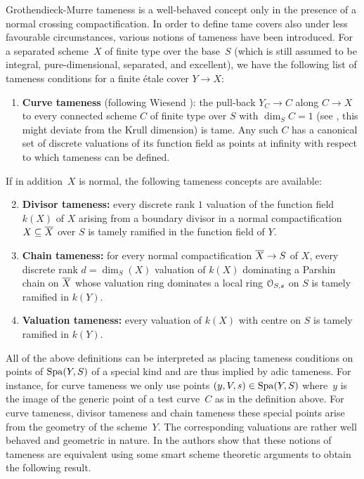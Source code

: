 Grothendieck-Murre tameness is a well-behaved concept only in the presence of a normal crossing compactification.
In order to define tame covers also under less favourable circumstances, various notions of tameness have been introduced.
For a separated scheme~$X$ of finite type over the base~$S$ (which is still assumed to be integral, pure-dimensional, separated, and excellent), we have the following list of tameness conditions for a finite étale cover $Y \to X$:
\begin{enumerate}
    \item \label{def:curve tameness}
    \textbf{Curve tameness} (following Wiesend \cite{Wiesend2008:TamelyRamifiedCovers}):    
    the pull-back $Y_C \to C$ along $C \to X$ to every connected scheme $C$ of finite type over $S$ with $\dim_S C = 1$ (see \cite[Definition on p.653]{KerzSchmidt2010:DifferentNotionsTameness}, this might deviate from the Krull dimension) is tame.
    Any such $C$ has a canonical set of discrete valuations of its function field as points at infinity with respect to which tameness can be defined.
\end{enumerate}
If in addition~$X$ is normal, the following tameness concepts are available:
\begin{enumerate}
    \setcounter{enumi}{1}
    \item  \label{def:divisor tameness}
    \textbf{Divisor tameness:} every discrete rank $1$ valuation of the function field $k(X)$ of $X$ arising from a boundary divisor in a normal compactification $X \subseteq \overline{X}$ over $S$ is tamely ramified in the function field of $Y$.
    \item  \label{def:chain tameness}
    \textbf{Chain tameness:} for every normal compactification $\overline{X} \to S$ of $X$,
    every discrete rank $d = \dim_S(X)$ valuation of $k(X)$ dominating a Parshin chain on $\overline{X}$ whose valuation ring dominates a local ring ${\mathcal O}_{S,s}$ on $S$ is tamely ramified in $k(Y)$.
    \item  \label{def:valuation tameness}
    \textbf{Valuation tameness:} every valuation of $k(X)$ with centre on $S$ is tamely ramified in $k(Y)$.   
\end{enumerate}
All of the above definitions can be interpreted as placing tameness conditions on points of $\operatorname{Spa}(Y,S)$ of a special kind and are thus implied by adic tameness.
For instance, for curve tameness we only use points $(y,V,s) \in \operatorname{Spa}(Y,S)$ where~$y$ is the image of the generic point of a test curve~$C$ as in the definition above.
For curve tameness, divisor tameness and chain tameness these special points arise from the geometry of the scheme~$Y$.
The corresponding valuations are rather well behaved and geometric in nature.
In \cite{KerzSchmidt2010:DifferentNotionsTameness} the authors show that these notions of tameness are equivalent using some smart scheme theoretic arguments to obtain the following result.

